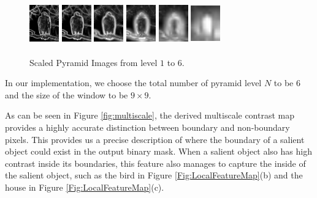 \documentclass[10pt,twocolumn,letterpaper]{article}
\begin{document}
\begin{figure}[b]
\begin{center} 
  \includegraphics[width=0.5in,height=0.75in]{./Figures/pyramid/5_145_145839_p0.jpg} 
 \includegraphics[width=0.5in,height=0.75in]{./Figures/pyramid/5_145_145839_p1.jpg} 
\includegraphics[width=0.5in,height=0.75in]{./Figures/pyramid/5_145_145839_p2.jpg} 
\includegraphics[width=0.5in,height=0.75in]{./Figures/pyramid/5_145_145839_p3.jpg} 
 \includegraphics[width=0.5in,height=0.75in]{./Figures/pyramid/5_145_145839_p4.jpg} 
 \includegraphics[width=0.5in,height=0.75in]{./Figures/pyramid/5_145_145839_p5.jpg}
 \caption{Scaled Pyramid Images from level $1$ to $6$.}
\end{center}
\end{figure}


In our implementation, we choose the total number of pyramid level $N$ to be $6$ and the size of the window to be $9 \times 9$. 

As can be seen in Figure \ref{fig:multiscale}, the derived multiscale contrast map provides a highly accurate distinction between boundary and non-boundary pixels. This provides us a precise description of where the boundary of a salient object could exist in the output binary mask. When a salient object also has high contrast inside its boundaries, this feature also manages to capture the inside of the salient object, such as the bird in Figure \ref{Fig:LocalFeatureMap}(b) and the house in Figure \ref{Fig:LocalFeatureMap}(c).
\end{document}
